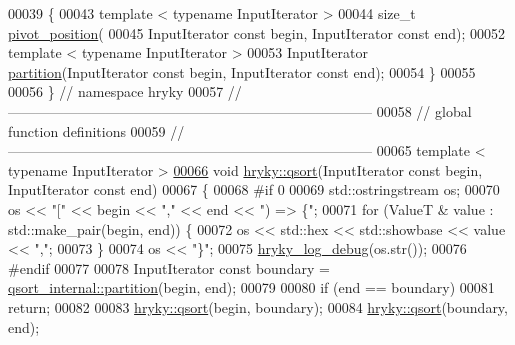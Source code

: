 \begin{DoxyCode}
00039     \{
00043         \textcolor{keyword}{template} < \textcolor{keyword}{typename} InputIterator >
00044         \textcolor{keywordtype}{size\_t} \hyperlink{namespacehryky_1_1qsort__internal_a2a9908c1e249d16e6701c06e341f9e1d}{pivot_position}(
00045             InputIterator \textcolor{keyword}{const} begin, InputIterator \textcolor{keyword}{const} end);
00052         \textcolor{keyword}{template} < \textcolor{keyword}{typename} InputIterator >
00053         InputIterator \hyperlink{namespacehryky_1_1qsort__internal_ac2e850d235f7ec38a913c4ea71d2970e}{partition}(InputIterator \textcolor{keyword}{const} begin, InputIterator \textcolor{keyword}{const} 
      end);
00054     \}
00055 
00056 \} \textcolor{comment}{// namespace hryky}
00057 \textcolor{comment}{//
      ------------------------------------------------------------------------------}
00058 \textcolor{comment}{// global function definitions}
00059 \textcolor{comment}{//
      ------------------------------------------------------------------------------}
00065 \textcolor{comment}{}\textcolor{keyword}{template} < \textcolor{keyword}{typename} InputIterator >
\hypertarget{qsort_8h_source_l00066}{}\hyperlink{namespacehryky_a438e3ee8f5109856c4a1e4daa9980982}{00066} \textcolor{keywordtype}{void} \hyperlink{namespacehryky_a438e3ee8f5109856c4a1e4daa9980982}{hryky::qsort}(InputIterator \textcolor{keyword}{const} begin, InputIterator \textcolor{keyword}{const} end)
00067 \{
00068 \textcolor{preprocessor}{#if 0}
00069 \textcolor{preprocessor}{}    std::ostringstream os;
00070     os << \textcolor{stringliteral}{"["} << begin << \textcolor{stringliteral}{","} << end << \textcolor{stringliteral}{") => \{"};
00071     \textcolor{keywordflow}{for} (ValueT & value : std::make\_pair(begin, end)) \{
00072         os << std::hex << std::showbase << value << \textcolor{stringliteral}{","};
00073     \}
00074     os << \textcolor{stringliteral}{"\}"};
00075     \hyperlink{log__writer__common_8h_ad94e7301fdfeec6ecd1cb63b4c81325a}{hryky_log_debug}(os.str());
00076 \textcolor{preprocessor}{#endif}
00077 \textcolor{preprocessor}{}
00078     InputIterator \textcolor{keyword}{const} boundary = \hyperlink{namespacehryky_1_1qsort__internal_ac2e850d235f7ec38a913c4ea71d2970e}{qsort_internal::partition}(begin, end);
00079 
00080     \textcolor{keywordflow}{if} (end == boundary)
00081         \textcolor{keywordflow}{return};
00082 
00083     \hyperlink{namespacehryky_a438e3ee8f5109856c4a1e4daa9980982}{hryky::qsort}(begin, boundary);
00084     \hyperlink{namespacehryky_a438e3ee8f5109856c4a1e4daa9980982}{hryky::qsort}(boundary, end);

\end{DoxyCode}
